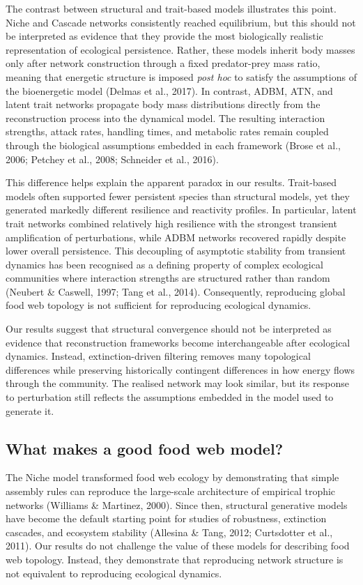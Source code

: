 \documentclass[
]{article}
\begin{document}
The contrast between structural and trait-based models illustrates this
point. Niche and Cascade networks consistently reached equilibrium, but
this should not be interpreted as evidence that they provide the most
biologically realistic representation of ecological persistence. Rather,
these models inherit body masses only after network construction through
a fixed predator-prey mass ratio, meaning that energetic structure is
imposed \emph{post hoc} to satisfy the assumptions of the bioenergetic
model (Delmas et al., 2017). In contrast, ADBM, ATN, and latent trait
networks propagate body mass distributions directly from the
reconstruction process into the dynamical model. The resulting
interaction strengths, attack rates, handling times, and metabolic rates
remain coupled through the biological assumptions embedded in each
framework (Brose et al., 2006; Petchey et al., 2008; Schneider et al.,
2016).

This difference helps explain the apparent paradox in our results.
Trait-based models often supported fewer persistent species than
structural models, yet they generated markedly different resilience and
reactivity profiles. In particular, latent trait networks combined
relatively high resilience with the strongest transient amplification of
perturbations, while ADBM networks recovered rapidly despite lower
overall persistence. This decoupling of asymptotic stability from
transient dynamics has been recognised as a defining property of complex
ecological communities where interaction strengths are structured rather
than random (Neubert \& Caswell, 1997; Tang et al., 2014). Consequently,
reproducing global food web topology is not sufficient for reproducing
ecological dynamics.

Our results suggest that structural convergence should not be
interpreted as evidence that reconstruction frameworks become
interchangeable after ecological dynamics. Instead, extinction-driven
filtering removes many topological differences while preserving
historically contingent differences in how energy flows through the
community. The realised network may look similar, but its response to
perturbation still reflects the assumptions embedded in the model used
to generate it.

\subsection{What makes a good food web
model?}\label{what-makes-a-good-food-web-model}

The Niche model transformed food web ecology by demonstrating that
simple assembly rules can reproduce the large-scale architecture of
empirical trophic networks (Williams \& Martinez, 2000). Since then,
structural generative models have become the default starting point for
studies of robustness, extinction cascades, and ecosystem stability
(Allesina \& Tang, 2012; Curtsdotter et al., 2011). Our results do not
challenge the value of these models for describing food web topology.
Instead, they demonstrate that reproducing network structure is not
equivalent to reproducing ecological dynamics.
\end{document}
